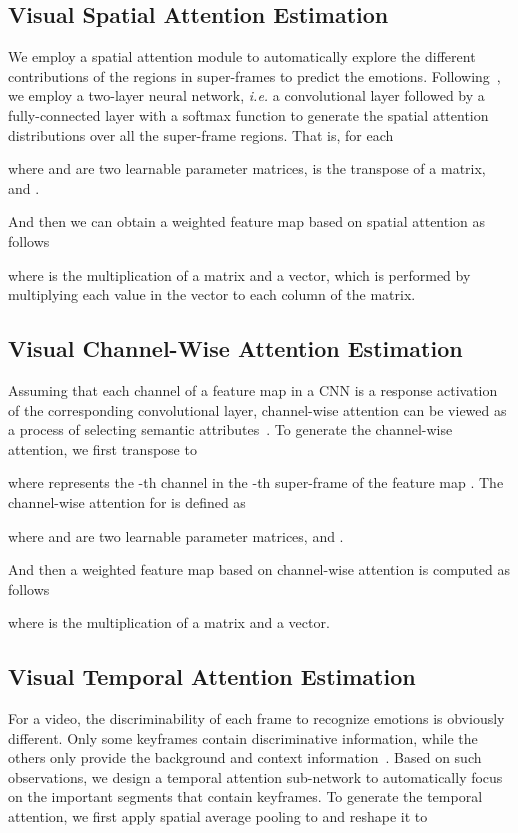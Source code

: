 \documentclass[letterpaper]{article} \usepackage{aaai20}  \usepackage{times}  \usepackage{helvet} \usepackage{courier}  \usepackage[hyphens]{url}  \usepackage{graphicx} \urlstyle{rm} \def\UrlFont{\rm}  \usepackage{graphicx}
\begin{document}
\subsection{Visual Spatial Attention Estimation}
\label{ssec:Spatial}
We employ a spatial attention module to automatically explore the different contributions of the regions in super-frames to predict the emotions. Following~\cite{chen2017sca}, we employ a two-layer neural network, \textit{i.e.} a  convolutional layer followed by a fully-connected layer with a softmax function to generate the spatial attention distributions over all the super-frame regions. That is, for each 

where  and  are two learnable parameter matrices,  is the transpose of a matrix, and .

And then we can obtain a weighted feature map based on spatial attention as follows

where  is the multiplication of a matrix and a vector, which is performed by multiplying each value in the vector to each column of the matrix.



\subsection{Visual Channel-Wise Attention Estimation}
\label{ssec:ChannelWise}
Assuming that each channel of a feature map in a CNN is a response activation of the corresponding convolutional layer, channel-wise attention can be viewed as a process of selecting semantic attributes~\cite{chen2017sca}. To generate the channel-wise attention, we first transpose  to 


where  represents the -th channel in the -th super-frame of the feature map . The channel-wise attention for  is defined as

where  and  are two learnable parameter matrices, and .

And then a weighted feature map based on channel-wise attention is computed as follows

where  is the multiplication of a matrix and a vector.





\subsection{Visual Temporal Attention Estimation}
For a video, the discriminability of each frame to recognize emotions is obviously different. Only some keyframes contain discriminative information, while the others only provide the background and context information~\cite{song2017end}. Based on such observations, we design a temporal attention sub-network to automatically focus on the important segments that contain keyframes. To generate the temporal attention, we first apply spatial average pooling to  and reshape it to 
\end{document}
